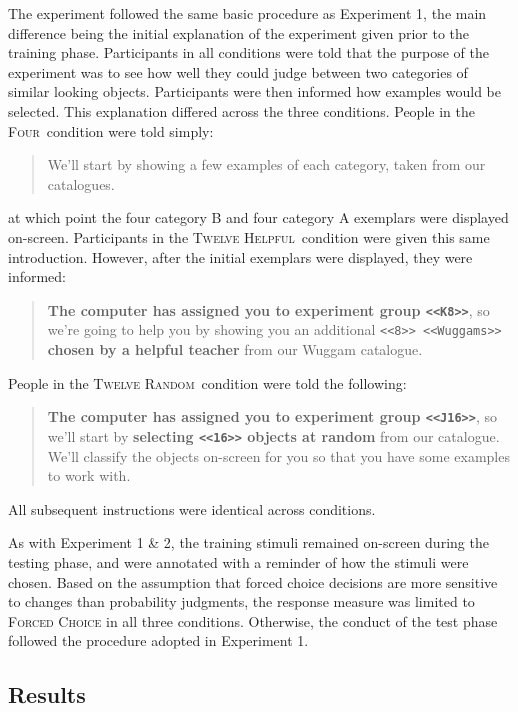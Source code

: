 \documentclass[doc,apacite]{apa6}
\newcommand{\random}{\textsc{Twelve Random}}
\newcommand{\helpful}{\textsc{Twelve Helpful}}
\newcommand{\neutral}{\textsc{Four}}
\begin{document}
The experiment followed the same basic procedure as Experiment 1, the main
difference being the initial explanation of the experiment given prior to the
training phase. Participants in all conditions were told that the purpose of the
experiment was to see how well they could judge between two categories of
similar looking objects. Participants were then informed how examples would be
selected. This explanation differed across the three conditions. People in the
\neutral\ condition were told simply:
%
\begin{quote}
  We'll start by showing a few examples of each category, taken from our catalogues.
\end{quote}
%
\noindent at which point the four category B and four category A exemplars were
displayed on-screen. Participants in the \helpful\ condition were given
this same introduction. However, after the initial exemplars were displayed,
they were informed:
%
\begin{quote}
{\bf The computer has assigned you to experiment group {\tt <<{\bf K8}>>}}, so we're
going to help you by showing you an additional {\tt <<8>> <<Wuggams>>} {\bf chosen by a helpful teacher} from our Wuggam catalogue.
\end{quote}
%
\noindent People in the \random\ condition were told the following:
%
\begin{quote}
{\bf The computer has assigned you to experiment group {\tt <<{\bf J16}>>}}, so
we'll start by {\bf selecting {\tt <<{\bf 16}>>} objects at random} from our catalogue. We'll classify the objects on-screen for you so that you have some examples to work with.
\end{quote}
%
All subsequent instructions were identical across conditions.

As with Experiment 1 \& 2, the training stimuli remained on-screen during the
testing phase, and were annotated with a reminder of how the stimuli were
chosen. Based on the assumption that forced choice decisions are more sensitive to
changes than probability judgments, the response measure was limited to
{\textsc{Forced Choice}} in all three conditions. Otherwise, the conduct of the
test phase followed the procedure adopted in Experiment 1.

\subsection{Results}
\end{document}
